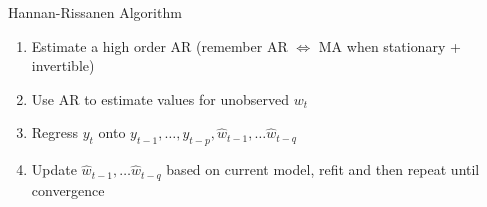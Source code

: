 \documentclass[11pt,ignorenonframetext,]{beamer}
\providecommand{\tightlist}{%
  \setlength{\itemsep}{0pt}\setlength{\parskip}{0pt}}
\begin{document}
\begin{frame}[t]{Hannan-Rissanen Algorithm}
\protect\hypertarget{hannan-rissanen-algorithm}{}

\begin{enumerate}
\tightlist
\item
  Estimate a high order AR (remember AR \(\Leftrightarrow\) MA when
  stationary + invertible)
\end{enumerate}

\vspace{5mm}

\begin{enumerate}
\setcounter{enumi}{1}
\tightlist
\item
  Use AR to estimate values for unobserved \(w_t\)
\end{enumerate}

\vspace{5mm}

\begin{enumerate}
\setcounter{enumi}{2}
\tightlist
\item
  Regress \(y_t\) onto
  \(y_{t-1}, \ldots, y_{t-p}, \hat{w}_{t-1}, \ldots \hat{w}_{t-q}\)
\end{enumerate}

\vspace{5mm}

\begin{enumerate}
\setcounter{enumi}{3}
\tightlist
\item
  Update \(\hat{w}_{t-1}, \ldots \hat{w}_{t-q}\) based on current model,
  refit and then repeat until convergence
\end{enumerate}

\end{frame}
\end{document}
